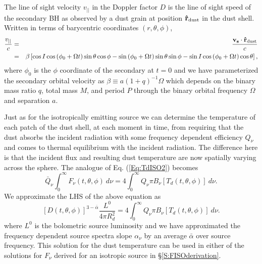 The line of sight velocity $v_{||}$ in the Doppler factor $D$ is the line of
sight speed of the secondary BH as  observed by a dust grain at position
$\mathbf{\hat{r}}_{\rm{dust}}$ in the dust shell. Written in terms of
barycentric coordinates $(r,\theta, \phi)$,
\begin{eqnarray}
\frac{v_{||}}{c} &=& \frac{\mathbf{v_{s}} \cdot \mathbf{\hat{r}}_{\rm{dust}} }{c}\\ \nonumber 
& = & \beta  \left[ \cos{I} \cos{(\phi_0+\Omega t)} \sin{\theta}\cos{\phi} - \sin{(\phi_0+\Omega t)} \sin{\theta}\sin{\phi} - \sin{I} \cos{(\phi_0+\Omega t)} \cos{\theta}  \right],
\label{Eq:vlos}
\end{eqnarray}
where $\phi_0$ is the $\phi$ coordinate of the secondary at $t=0$ and we have
parameterized the secondary orbital velocity as $\beta \equiv a (1+q)^{-1}
\Omega$ which depends on the binary mass ratio $q$, total mass $M$, and period
$P$ through the binary orbital frequency $\Omega$ and separation $a$.



Just as for the isotropically emitting source we can determine the temperature
of each patch of the dust shell, at each moment in time, from requiring that
the dust absorbs the incident radiation with some frequency dependent
efficiency $Q_{\nu}$ and comes to thermal equilibrium with the incident
radiation. The difference here is that the incident flux and resulting dust
temperature are now spatially varying across the sphere. The analogue of Eq.
(\ref{Eq:TdISO2}) becomes
\begin{equation}
\label{Eq:TdDop1}
\bar{Q}_{\nu} \int^{\infty}_{0}{F_{\nu}(t, \theta, \phi)  \ d \nu } =   4 \int^{\infty}_{0}{Q_{\nu} \pi B_{\nu}\left[T_d(t,\theta, \phi)\right] \ d\nu}.
\end{equation}
We approximate the LHS of the above equation as
\begin{equation}
\label{Eq:TdDop}
\left[D(t, \theta, \phi)\right]^{3-\bar{\alpha}} \frac{L^0}{4 \pi R^2_d}  =   4 \int^{\infty}_{0}{Q_{\nu} \pi B_{\nu}\left[T_d(t,\theta, \phi)\right] \ d\nu}. 
\end{equation}
where $L^0$ is the bolometric source luminosity and we have approximated the
frequency dependent source spectra slope $\alpha_{\nu}$ by an average
$\bar{\alpha}$ over source frequency. This solution for the dust temperature
can be used in either of the solutions for $F_{\nu}$ derived for an isotropic
source in \S \ref{S:FISOderivation}.



